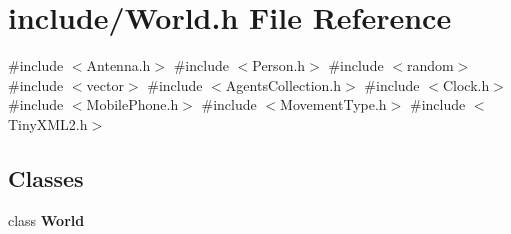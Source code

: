 \section{include/\+World.h File Reference}
\label{_world_8h}
{\ttfamily \#include $<$Antenna.\+h$>$}\newline
{\ttfamily \#include $<$Person.\+h$>$}\newline
{\ttfamily \#include $<$random$>$}\newline
{\ttfamily \#include $<$vector$>$}\newline
{\ttfamily \#include $<$Agents\+Collection.\+h$>$}\newline
{\ttfamily \#include $<$Clock.\+h$>$}\newline
{\ttfamily \#include $<$Mobile\+Phone.\+h$>$}\newline
{\ttfamily \#include $<$Movement\+Type.\+h$>$}\newline
{\ttfamily \#include $<$Tiny\+X\+M\+L2.\+h$>$}\newline
\subsection*{Classes}
\begin{DoxyCompactItemize}
\item 
class \textbf{ World}
\end{DoxyCompactItemize}
